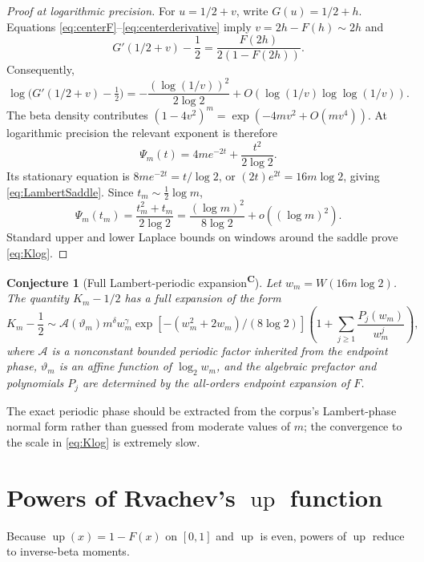 \documentclass[11pt,oneside]{article}
\newtheorem{conjecture}[theorem]{Conjecture}
\theoremstyle{definition}
\theoremstyle{remark}
\newcommand{\F}{F}
\newcommand{\G}{G}
\newcommand{\Up}{\operatorname{up}}
\newcommand{\tagconj}{\textsuperscript{\textcolor{oliveink}{\bfseries C}}}
\begin{document}
\begin{proof}[Proof at logarithmic precision]
For \(u=1/2+v\), write \(\G(u)=1/2+h\).  Equations
\eqref{eq:centerF}--\eqref{eq:centerderivative} imply \(v=2h-\F(h)\sim2h\) and
\[
 \G'(1/2+v)-\frac12
 =\frac{\F(2h)}{2(1-\F(2h))}.
\]
Consequently,
\begin{equation}\label{eq:gprimeendpoint}
 \log\bigl(\G'(1/2+v)-\tfrac12\bigr)
 =-\frac{(\log(1/v))^2}{2\log2}
 +O(\log(1/v)\log\log(1/v)).
\end{equation}
The beta density contributes
\((1-4v^2)^m=\exp(-4mv^2+O(mv^4))\).  At logarithmic precision the relevant
exponent is therefore
\[
 \Psi_m(t)=4me^{-2t}+\frac{t^2}{2\log2}.
\]
Its stationary equation is
\(8me^{-2t}=t/\log2\), or
\((2t)e^{2t}=16m\log2\), giving \eqref{eq:LambertSaddle}.  Since
\(t_m\sim\tfrac12\log m\),
\[
 \Psi_m(t_m)=\frac{t_m^2+t_m}{2\log2}
 =\frac{(\log m)^2}{8\log2}+o((\log m)^2).
\]
Standard upper and lower Laplace bounds on windows around the saddle prove
\eqref{eq:Klog}.
\end{proof}

\begin{conjecture}[Full Lambert-periodic expansion\tagconj]\label{conj:Kfull}
Let \(w_m=W(16m\log2)\).  The quantity \(K_m-1/2\) has a full expansion of the
form
\begin{equation}\label{eq:Kfullconj}
 K_m-\frac12
 \sim \mathcal A(\vartheta_m)
 m^{\delta}w_m^{\gamma}\exp\!\left[-(w_m^2+2w_m)/(8\log2)\right]
 \left(1+\sum_{j\ge1}\frac{P_j(w_m)}{w_m^j}\right),
\end{equation}
where \(\mathcal A\) is a nonconstant bounded periodic factor inherited from the
endpoint phase, \(\vartheta_m\) is an affine function of
\(\log_2 w_m\), and the algebraic prefactor and polynomials \(P_j\) are determined by the
all-orders endpoint expansion of \(\F\).
\end{conjecture}

The exact periodic phase should be extracted from the corpus's Lambert-phase
normal form rather than guessed from moderate values of \(m\); the convergence
to the scale in \eqref{eq:Klog} is extremely slow.

\section{Powers of Rvachev's \(\Up\) function}

Because \(\Up(x)=1-\F(x)\) on \([0,1]\) and \(\Up\) is even, powers of \(\Up\)
reduce to inverse-beta moments.
\end{document}
